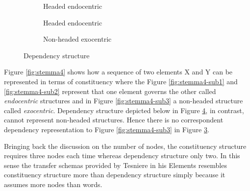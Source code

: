 \begin{figure}[!ht]
    \centering
    \begin{subfigure}{.33\textwidth}
        \centering
        \caption{Headed endocentric}
        \label{fig:stemma5-sub1}
    \end{subfigure}%
    \begin{subfigure}{.33\textwidth}
        \centering
        \caption{Headed endocentric}
        \label{fig:stemma5-sub2}
    \end{subfigure}
    \begin{subfigure}{.33\textwidth}
        \centering
        \caption{Non-headed exocentric}
        \label{fig:stemma5-sub3}
    \end{subfigure}
    \caption{Dependency structure}
    \label{fig:stemma5}
\end{figure}


Figure \ref{fig:stemma4} shows how a sequence of two elements X and Y can be represented in terms of constituency where the Figure \ref{fig:stemma4-sub1} and \ref{fig:stemma4-sub2} represent that one element governs the other called \textit{endocentric} structures and in Figure \ref{fig:stemma4-sub3} a non-headed structure called \textit{exocentric}. Dependency structure depicted below in Figure \ref{fig:stemma5}, in contrast, cannot represent non-headed structures. Hence there is no correspondent dependency representation to Figure \ref{fig:stemma4-sub3} in Figure \ref{fig:stemma5-sub3}. 

Bringing back the discussion on the number of nodes, the constituency structure requires three nodes each time whereas dependency structure only two. In this sense the transfer schemas provided by Tesniere in his Elements \citep{Tesniere59} resembles constituency structure more than dependency structure simply because it assumes more nodes than words. 

